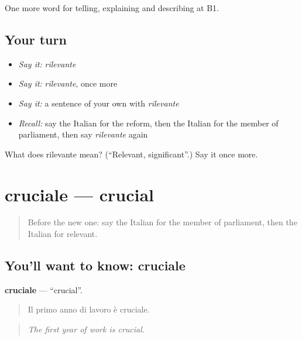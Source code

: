 \begin{grammarlens}[title={What you've built}]
One more word for telling, explaining and describing at B1.
\end{grammarlens}

\subsection*{Your turn}
\begin{itemize}
\raggedright
  \item \emph{Say it:} \emph{rilevante}
  \item \emph{Say it:} \emph{rilevante}, once more
  \item \emph{Say it:} a sentence of your own with \emph{rilevante}
  \item \emph{Recall:} say the Italian for the reform, then the Italian for the member of parliament, then say \emph{rilevante} again
\end{itemize}

\begin{tcolorbox}[breakable,colback=teal!4,colframe=teal!35!black,title={Before you move on}]
What does rilevante mean? (\textquotedblleft{}Relevant, significant\textquotedblright{}.) Say it once more.
\end{tcolorbox}
\section[cruciale]{cruciale — crucial}

\label{lesson:IT-C371-cruciale}



\begin{quote}
Before the new one: say the Italian for the member of parliament, then the Italian for relevant.
\end{quote}

\subsection*{You'll want to know: cruciale}
\textbf{cruciale} — \textquotedblleft{}crucial\textquotedblright{}.

\begin{quote}
Il primo anno di lavoro è cruciale.
\end{quote}

\begin{quote}
\emph{The first year of work is crucial.}
\end{quote}

